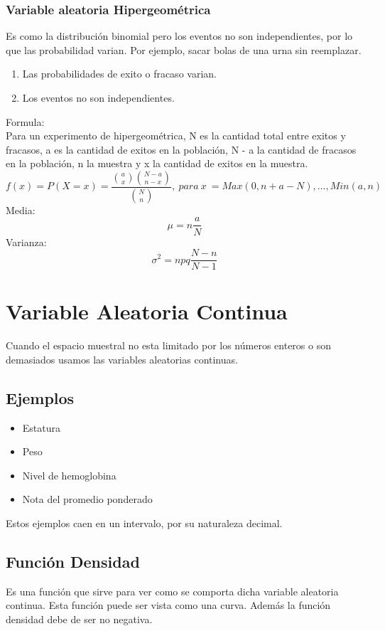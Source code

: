 \documentclass{article}
\begin{document}
\subsubsection{Variable aleatoria Hipergeométrica}
Es como la distribución binomial pero los eventos no son independientes, por lo que las probabilidad varian. Por ejemplo, sacar bolas de una urna sin reemplazar.\\
\begin{enumerate}
    \item Las probabilidades de exito o fracaso varian.
    \item Los eventos no son independientes.
\end{enumerate}
Formula:\\
Para un experimento de hipergeométrica, N es la cantidad total entre exitos y fracasos, a es la cantidad de exitos en la población, N - a la cantidad de fracasos en la población, n la muestra y x la cantidad de exitos en la muestra. \\
\[ f(x)=P(X=x)={\frac{{a \choose x}{N - a \choose n - x}}{{N \choose n}}},\ para\ x\ =Max(0, n + a - N),...,Min(a,n) \]
Media:\\
\[\mu=n\frac{a}{N}\]
Varianza:
\[\sigma^{2}=npq\frac{N-n}{N-1}\]


\section{Variable Aleatoria Continua}
Cuando el espacio muestral no esta limitado por los números enteros o son demasiados usamos las variables aleatorias continuas.

\subsection*{Ejemplos}
\begin{itemize}
    \item Estatura 
    \item Peso
    \item Nivel de hemoglobina
    \item Nota del promedio ponderado
\end{itemize}
Estos ejemplos caen en un intervalo, por su naturaleza decimal. \\

\subsection{Función Densidad}
Es una función que sirve para ver como se comporta dicha variable aleatoria continua. Esta función puede ser vista como una curva. Además la función densidad debe de ser no negativa.
\end{document}
